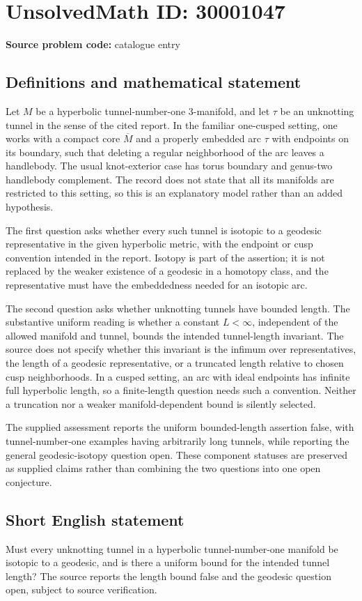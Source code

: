 \documentclass[11pt]{article}
\begin{document}
\section*{UnsolvedMath ID: 30001047}
\textbf{Source problem code:} catalogue entry
\subsection{Definitions and mathematical statement}
Let \(M\) be a hyperbolic tunnel-number-one \(3\)-manifold, and let \(\tau\) be an unknotting tunnel in the sense of the cited report. In the familiar one-cusped setting, one works with a compact core \(\overline M\) and a properly embedded arc \(\tau\) with endpoints on its boundary, such that deleting a regular neighborhood of the arc leaves a handlebody. The usual knot-exterior case has torus boundary and genus-two handlebody complement. The record does not state that all its manifolds are restricted to this setting, so this is an explanatory model rather than an added hypothesis.

The first question asks whether every such tunnel is isotopic to a geodesic representative in the given hyperbolic metric, with the endpoint or cusp convention intended in the report. Isotopy is part of the assertion; it is not replaced by the weaker existence of a geodesic in a homotopy class, and the representative must have the embeddedness needed for an isotopic arc.

The second question asks whether unknotting tunnels have bounded length. The substantive uniform reading is whether a constant \(L<\infty\), independent of the allowed manifold and tunnel, bounds the intended tunnel-length invariant. The source does not specify whether this invariant is the infimum over representatives, the length of a geodesic representative, or a truncated length relative to chosen cusp neighborhoods. In a cusped setting, an arc with ideal endpoints has infinite full hyperbolic length, so a finite-length question needs such a convention. Neither a truncation nor a weaker manifold-dependent bound is silently selected.

The supplied assessment reports the uniform bounded-length assertion false, with tunnel-number-one examples having arbitrarily long tunnels, while reporting the general geodesic-isotopy question open. These component statuses are preserved as supplied claims rather than combining the two questions into one open conjecture.
\subsection{Short English statement}
Must every unknotting tunnel in a hyperbolic tunnel-number-one manifold be isotopic to a geodesic, and is there a uniform bound for the intended tunnel length? The source reports the length bound false and the geodesic question open, subject to source verification.
\end{document}
